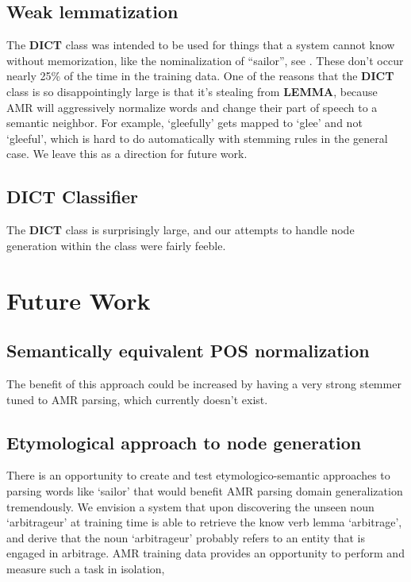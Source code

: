 \documentclass[11pt]{article}
\begin{document}


\subsection{Weak lemmatization}

The \textbf{DICT} class was intended to be used for things that a system cannot know without memorization, like the nominalization of ``sailor'', see . These don't occur nearly 25\% of the time in the training data. One of the reasons that the \textbf{DICT} class is so disappointingly large is that it's stealing from \textbf{LEMMA}, because AMR will aggressively normalize words and change their part of speech to a semantic neighbor. For example, `gleefully' gets mapped to `glee' and not `gleeful', which is hard to do automatically with stemming rules in the general case. We leave this as a direction for future work.

\subsection{DICT Classifier}

The \textbf{DICT} class is surprisingly large, and our attempts to handle node generation within the class were fairly feeble.

\section{Future Work}
\subsection{Semantically equivalent POS normalization}
The benefit of this approach could be increased by having a very strong stemmer tuned to AMR parsing, which currently doesn't exist.
\subsection{Etymological approach to node generation}
There is an opportunity to create and test etymologico-semantic approaches to parsing words like `sailor' that would benefit AMR parsing domain generalization tremendously. We envision a system that upon discovering the unseen noun `arbitrageur' at training time is able to retrieve the know verb lemma `arbitrage', and derive that the noun `arbitrageur' probably refers to an entity that is engaged in arbitrage. AMR training data provides an opportunity to perform and measure such a task in isolation, 
\end{document}
